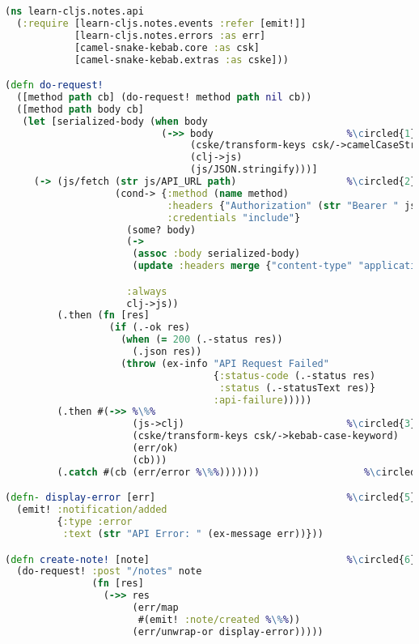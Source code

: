 \documentclass[10pt,twoside,openright]{memoir}
\newcommand*\circled[1]{\tikz[baseline=(char.base)]{
            \node[shape=circle,draw,inner sep=1pt] (char) {#1};}}
\begin{document}
\begin{lstlisting}[language=Clojure, caption={notes/api.cljs}]
(ns learn-cljs.notes.api
  (:require [learn-cljs.notes.events :refer [emit!]]
            [learn-cljs.notes.errors :as err]
            [camel-snake-kebab.core :as csk]
            [camel-snake-kebab.extras :as cske]))

(defn do-request!
  ([method path cb] (do-request! method path nil cb))
  ([method path body cb]
   (let [serialized-body (when body
                           (->> body                       %\circled{1}%
                                (cske/transform-keys csk/->camelCaseString)
                                (clj->js)
                                (js/JSON.stringify)))]
     (-> (js/fetch (str js/API_URL path)                   %\circled{2}%
                   (cond-> {:method (name method)
                            :headers {"Authorization" (str "Bearer " js/API_TOKEN)}
                            :credentials "include"}
                     (some? body)
                     (->
                      (assoc :body serialized-body)
                      (update :headers merge {"content-type" "application/json"}))

                     :always
                     clj->js))
         (.then (fn [res]
                  (if (.-ok res)
                    (when (= 200 (.-status res))
                      (.json res))
                    (throw (ex-info "API Request Failed"
                                    {:status-code (.-status res)
                                     :status (.-statusText res)}
                                    :api-failure)))))
         (.then #(->> %\%%
                      (js->clj)                            %\circled{3}%
                      (cske/transform-keys csk/->kebab-case-keyword)
                      (err/ok)
                      (cb)))
         (.catch #(cb (err/error %\%%)))))))                  %\circled{4}%

(defn- display-error [err]                                 %\circled{5}%
  (emit! :notification/added
         {:type :error
          :text (str "API Error: " (ex-message err))}))

(defn create-note! [note]                                  %\circled{6}%
  (do-request! :post "/notes" note
               (fn [res]
                 (->> res
                      (err/map
                       #(emit! :note/created %\%%))
                      (err/unwrap-or display-error)))))
\end{lstlisting}
\end{document}
